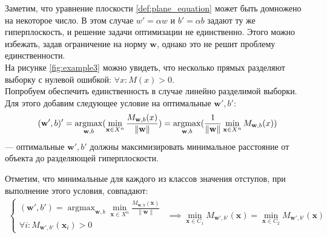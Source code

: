 \documentclass[%
bachelor,    %
subf,        %
href,        %
colorlinks,  %
]{disser}
\let\vec=\mathbf
\DeclareMathOperator*{\argmax}{argmax}
\begin{document}
Заметим, что уравнение плоскости \ref{def:plane_equation} может быть домножено на некоторое число. В этом случае $w'= \alpha w$ и $b' = \alpha b$ задают ту же гиперплоскость, и решение задачи оптимизации не единственно. Этого можно избежать, задав ограничение на норму $\vec{w}$, однако это не решит проблему единственности.\\
На рисунке \ref{fig:example3} можно увидеть, что несколько прямых разделяют выборку с нулевой ошибкой: $\forall x: M(x)>0.$\\
Попробуем обеспечить единственность в случае линейно разделимой выборки. Для этого добавим следующее условие на оптимальные $\vec{w'},b'$:
$$(\vec{w'},b)'  =\argmax_{\vec{w},b} (\min_{\vec{x} \in X^n} \frac{M_{\vec{w},b}(x)}{\|\vec{w}\|}) \\
=\argmax_{\vec{w},b} (\frac{1}{\|\vec{w}\|}\min_{\vec{x} \in X^n} M_{\vec{w},b}(x)) $$
---  оптимальные $\vec{w'},b'$ должны максимизировать минимальное расстояние от объекта до разделяющей гиперплоскости.

Отметим, что минимальные для каждого из классов значения отступов, при выполнение этого условия, совпадают:
\begin{equation*}
\begin{gathered}
\begin{cases}
(\vec{w'},b')  =\argmax_{\vec{w},b} \min_{\vec{x} \in X^n} \frac{ M_{\vec{w},b}(\vec{x})}{\|\vec{w}\|}\\
\forall i : M_{\vec{w}',b'}(\vec{x}_i)>0
\end{cases}
\end{gathered}
\implies
\min_{\vec{x} \in C_1} M_{\vec{w}',b'}(\vec{x}) = \min_{\vec{x} \in C_2} M_{\vec{w}',b'}(\vec{x})
\end{equation*}
\end{document}
